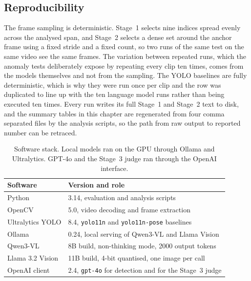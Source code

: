 \subsection{Reproducibility}

The frame sampling is deterministic. Stage~1 selects nine indices spread
evenly across the analysed span, and Stage~2 selects a dense set around
the anchor frame using a fixed stride and a fixed count, so two runs of
the same test on the same video see the same frames. The variation between
repeated runs, which the anomaly tests deliberately expose by repeating
every clip ten times, comes from the models themselves and not from the
sampling. The YOLO baselines are fully deterministic, which is why they
were run once per clip and the row was duplicated to line up with the ten
language model runs rather than being executed ten times. Every run writes
its full Stage~1 and Stage~2 text to disk, and the summary tables in this
chapter are regenerated from four comma separated files by the analysis
scripts, so the path from raw output to reported number can be retraced.

\begin{table}[h]
\centering
\small
\setlength{\tabcolsep}{8pt}
\begin{tabular}{@{}l l@{}}
\toprule
Software & Version and role \\
\midrule
Python              & 3.14, evaluation and analysis scripts \\
OpenCV             & 5.0, video decoding and frame extraction \\
Ultralytics YOLO   & 8.4, \texttt{yolo11n} and \texttt{yolo11n-pose} baselines \\
Ollama             & 0.24, local serving of Qwen3-VL and Llama Vision \\
Qwen3-VL           & 8B build, non-thinking mode, 2000 output tokens \\
Llama 3.2 Vision   & 11B build, 4-bit quantised, one image per call \\
OpenAI client      & 2.4, \texttt{gpt-4o} for detection and for the Stage~3 judge \\
\bottomrule
\end{tabular}
\caption{Software stack. Local models ran on the GPU through Ollama and
Ultralytics. GPT-4o and the Stage~3 judge ran through the OpenAI
interface.}
\label{tab:setup-sw}
\end{table}
\FloatBarrier
